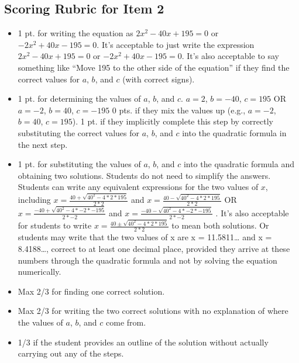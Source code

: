 \documentclass[11pt,a4paper]{article}
\begin{document}
\subsection{Scoring Rubric for Item 2}
\label{sec:rubric}
\begin{itemize}
\item {1 pt. for writing the equation as $2x^2 - 40x + 195 = 0$  or $-2x^2 +40x - 195 = 0$. 
It’s acceptable to just write the expression $2x^2 - 40x + 195 = 0$ or $-2x^2 +40x - 195 = 0$.
It’s also acceptable to say something like “Move 195 to the other side of the equation” if they find the correct values for $a$, $b$, and $c$ (with correct signs).}

\item {1 pt. for determining the values of $a$, $b$, and $c$.
$a = 2$, $b = −40$, $c = 195$ OR $a = −2$, $b = 40$, $c = −195$
0 pts. if they mix the values up (e.g., $a = −2$, $b = 40$, $c = 195$).
1 pt. if they implicitly complete this step by correctly substituting the correct values for $a$, $b$, and $c$ into the quadratic formula in the next step.}

\item {1 pt. for substituting the values of $a$, $b$, and $c$ into the quadratic formula and obtaining two solutions. Students do not need to simplify the answers. 
Students can write any equivalent expressions for the two values of $x$, including $x = \frac{40 + \sqrt{40^2 - 4 * 2 * 195}}{2 * 2}$  and $x = \frac{40 - \sqrt{40^2 - 4 * 2 * 195}}{2 * 2}$  OR $x = \frac{-40 + \sqrt{40^2 - 4 * -2 * -195}}{2 * -2}$   and $x = \frac{-40 - \sqrt{40^2 - 4 * -2 * -195}}{2 * -2}$ . 
It’s also acceptable for students to write $x = \frac{40 \pm \sqrt{40^2 - 4 * 2 * 195}}{2 * 2}$  to mean both solutions. Or students may write that the two values of x are x = 11.5811… and x = 8.4188…, correct to at least one decimal place, provided they arrive at these numbers through the quadratic formula and not by solving the equation numerically.}

\item Max 2/3 for finding one correct solution.
\item Max 2/3 for writing the two correct solutions with no explanation of where the values of $a$, $b$, and $c$ come from.
\item 1/3 if the student provides an outline of the solution without actually carrying out any of the steps.
\end{itemize}
\end{document}
